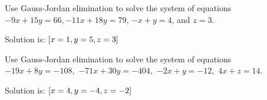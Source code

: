 \begin{enumialphparenastyle}
\begin{ex} Use Gauss-Jordan elimination to solve the system of equations 
$-9x+15y=66,-11x+18y=79$, $-x+y=4$, and $z=3$.
\begin{sol}
Solution is: $\left[x=1,y=5,z=3\right] $
\end{sol}
\end{ex}

\begin{ex} Use Gauss-Jordan elimination to solve the system of equations $-19x+8y=-108,$
$-71x+30y=-404,$ $-2x+y=-12,$ $4x+z=14.$
\begin{sol}
Solution is: $\left[x=4,y=-4,z=-2\right] $
\end{sol}
\end{ex}


\end{enumialphparenastyle}
